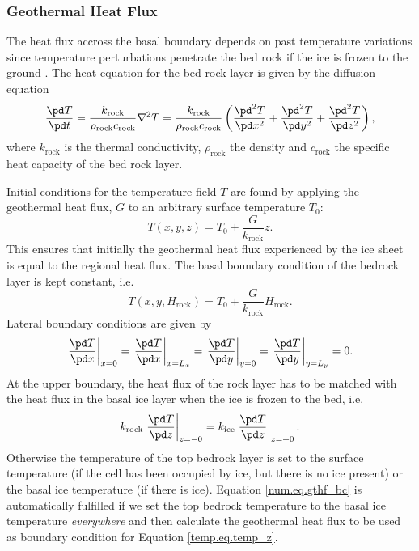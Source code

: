 \subsubsection{Geothermal Heat Flux}
The heat flux accross the basal boundary depends on past temperature variations since temperature perturbations penetrate the bed rock if the ice is frozen to the ground \citep{Ritz1987}. 
The heat equation for the bed rock layer is given by the diffusion equation
\begin{equation}
  \label{num.eq.diffu_rock}
  \frac{\pd T}{\pd t} = \frac{k_{\text{rock}}}{\rho_{\text{rock}}c_{\text{rock}}}\nabla^2T=\frac{k_{\text{rock}}}{\rho_{\text{rock}}c_{\text{rock}}} 
  \left(\frac{\pd^2 T}{\pd x^2}+\frac{\pd^2 T}{\pd y^2}+\frac{\pd^2 T}{\pd z^2}\right),
\end{equation}
where $k_{\text{rock}}$ is the thermal conductivity, $\rho_{\text{rock}}$ the density and $c_{\text{rock}}$ the specific heat capacity of the bed rock layer. 

Initial conditions for the temperature field $T$ are found by applying the geothermal heat flux, $G$ to an arbitrary surface temperature $T_0$:
\begin{equation}
  T(x,y,z)=T_0+\frac{G}{k_{\text{rock}}}z.
\end{equation}
This ensures that initially the geothermal heat flux experienced by the ice sheet is equal to the regional heat flux. The basal boundary condition of the bedrock layer is kept constant, i.e.
\begin{equation}
  T(x,y,H_{\text{rock}})=T_0+\frac{G}{k_{\text{rock}}}H_{\text{rock}}.
\end{equation}
Lateral boundary conditions are given by
\begin{equation}
  \left.\frac{\pd T}{\pd x}\right|_{x=0} = \left.\frac{\pd T}{\pd x}\right|_{x=L_x} = \left.\frac{\pd T}{\pd y}\right|_{y=0} = \left.\frac{\pd T}{\pd y}\right|_{y=L_y} = 0.
\end{equation}
At the upper boundary, the heat flux of the rock layer has to be matched with the heat flux in the basal ice layer when the ice is frozen to the bed, i.e.
\begin{equation}
  \label{num.eq.gthf_bc}
  k_{\text{rock}}\left.\frac{\pd T}{\pd z}\right|_{z=-0}=k_{\text{ice}}\left.\frac{\pd T}{\pd z}\right|_{z=+0}.
\end{equation}
Otherwise the temperature of the top bedrock layer is set to the surface temperature (if the cell has been occupied by ice, but there is no ice present) or the basal ice temperature (if there is ice). Equation \eqref{num.eq.gthf_bc} is automatically fulfilled if we set the top bedrock temperature to the basal ice temperature \emph{everywhere} and then calculate the geothermal heat flux to be used as boundary condition for Equation \eqref{temp.eq.temp_z}.



